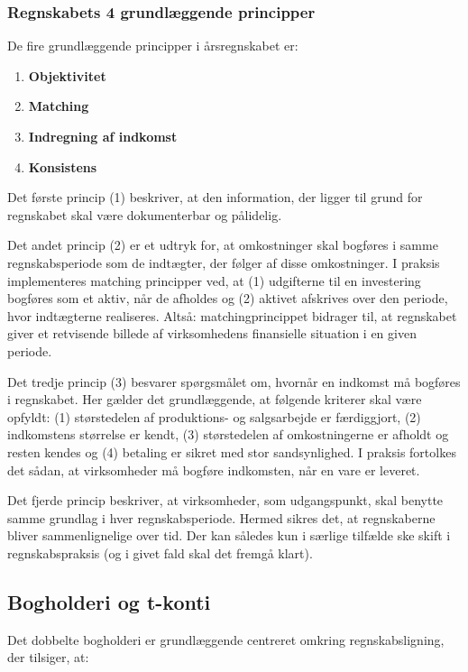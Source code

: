 \documentclass[10pt,reqno, usenames]{article}
\begin{document}
\subsubsection{Regnskabets 4 grundlæggende principper}
De fire grundlæggende principper i årsregnskabet er: 

\begin{enumerate}
    \item \textbf{Objektivitet}
    \item \textbf{Matching}
    \item \textbf{Indregning af indkomst}
    \item \textbf{Konsistens}
\end{enumerate}

Det første princip (1) beskriver, at den information, der ligger til grund for regnskabet skal være dokumenterbar og pålidelig. 

\hspace{10 pt}

Det andet princip (2) er et udtryk for, at omkostninger skal bogføres i samme regnskabsperiode som de indtægter, der følger af disse omkostninger. I praksis implementeres matching principper ved, at (1) udgifterne til en investering bogføres som et aktiv, når de afholdes og (2) aktivet afskrives over den periode, hvor indtægterne realiseres. Altså: matchingprincippet bidrager til, at regnskabet giver et retvisende billede af virksomhedens finansielle situation i en given periode. 

\hspace{10 pt}

Det tredje princip (3) besvarer spørgsmålet om, hvornår en indkomst må bogføres i regnskabet. Her gælder det grundlæggende, at følgende kriterer skal være opfyldt: (1) størstedelen af produktions- og salgsarbejde er færdiggjort, (2) indkomstens størrelse er kendt, (3) størstedelen af omkostningerne er afholdt og resten kendes og (4) betaling er sikret med stor sandsynlighed. I praksis fortolkes det sådan, at virksomheder må bogføre indkomsten, når en vare er leveret. 

\hspace{10 pt}

Det fjerde princip beskriver, at virksomheder, som udgangspunkt, skal benytte samme grundlag i hver regnskabsperiode. Hermed sikres det, at regnskaberne bliver sammenlignelige over tid. Der kan således kun i særlige tilfælde ske skift i regnskabspraksis (og i givet fald skal det fremgå klart). 

\subsection{Bogholderi og t-konti}
Det dobbelte bogholderi er grundlæggende centreret omkring regnskabsligning, der tilsiger, at: 
\end{document}
